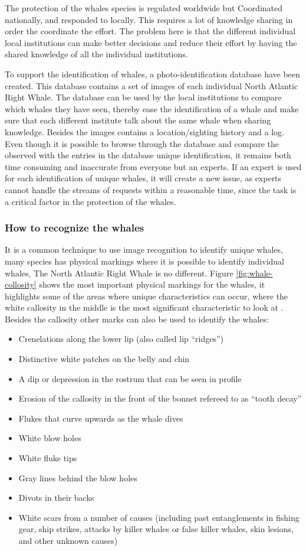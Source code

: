 The protection of the whales species is regulated worldwide but Coordinated nationally, and responded to locally. This requires a lot of knowledge sharing in order the coordinate the effort. The problem here is that the different individual local institutions can make better decisions and reduce their effort by having the shared knowledge of all the individual institutions.

To support the identification of whales, a photo-identification database have been created. This database contains a set of images of each individual North Atlantic Right Whale. 
The database can be used by the local institutions to compare which whales they have seen, thereby ease the identification of a whale and make sure that each different institute talk about the same whale when sharing knowledge. Besides the images contains a location/sighting history and a log.
Even though it is possible to browse through the database and compare the observed with the entries in the database unique identification, it remains both time consuming and inaccurate from everyone but an experts.
If an expert is used for each identification of unique whales, it will create a new issue, as experts cannot handle the streams of requests within a reasonable time, since the task is a critical factor in the protection of the whales. 

\subsubsection{How to recognize the whales}
It is a common technique to use image recognition to identify unique whales, many species has physical markings where it is possible to identify individual whales, The North Atlantic Right Whale is no different. Figure \ref{fig:whale-collosity} shows the most important physical markings for the whales, it highlights some of the areas where unique characteristics can occur, where the white callosity in the middle is the most significant characteristic to look at \cite{neaq:whale-identity}. Besides the callosity other marks can also be used to identify the whales:

\begin{itemize}
	\item Crenelations along the lower lip (also called lip “ridges”)
	\item Distinctive white patches on the belly and chin
	\item A dip or depression in the rostrum that can be seen in profile
	\item Erosion of the callosity in the front of the bonnet refereed to as “tooth decay”
	\item Flukes that curve upwards as the whale dives
	\item White blow holes
	\item White fluke tips
	\item Gray lines behind the blow holes
	\item Divots in their backs
	\item White scars from a number of causes (including past entanglements in fishing gear, ship strikes, attacks by killer whales or false killer whales, skin lesions, and other unknown causes)
\end{itemize}

